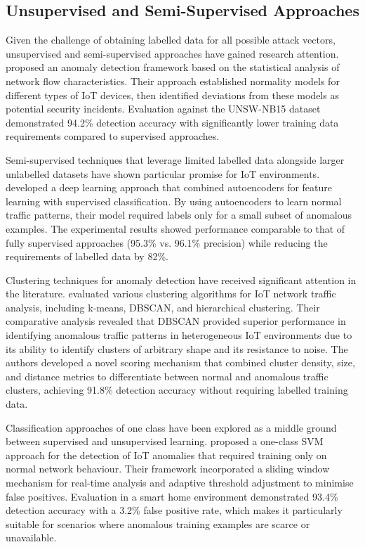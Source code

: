 \subsection{Unsupervised and Semi-Supervised Approaches}

Given the challenge of obtaining labelled data for all possible attack vectors, unsupervised and semi-supervised approaches have gained research attention. \citet{booij2021ton_iot} proposed an anomaly detection framework based on the statistical analysis of network flow characteristics. Their approach established normality models for different types of IoT devices, then identified deviations from these models as potential security incidents. Evaluation against the UNSW-NB15 dataset demonstrated 94.2\% detection accuracy with significantly lower training data requirements compared to supervised approaches.

Semi-supervised techniques that leverage limited labelled data alongside larger unlabelled datasets have shown particular promise for IoT environments. \citet{Nguyen2019} developed a deep learning approach that combined autoencoders for feature learning with supervised classification. By using autoencoders to learn normal traffic patterns, their model required labels only for a small subset of anomalous examples. The experimental results showed performance comparable to that of fully supervised approaches (95.3\% vs. 96.1\% precision) while reducing the requirements of labelled data by 82\%.

Clustering techniques for anomaly detection have received significant attention in the literature. \citet{Bartos2019} evaluated various clustering algorithms for IoT network traffic analysis, including k-means, DBSCAN, and hierarchical clustering. Their comparative analysis revealed that DBSCAN provided superior performance in identifying anomalous traffic patterns in heterogeneous IoT environments due to its ability to identify clusters of arbitrary shape and its resistance to noise. The authors developed a novel scoring mechanism that combined cluster density, size, and distance metrics to differentiate between normal and anomalous traffic clusters, achieving 91.8\% detection accuracy without requiring labelled training data.

Classification approaches of one class have been explored as a middle ground between supervised and unsupervised learning. \citet{Sarigiannidis2021} proposed a one-class SVM approach for the detection of IoT anomalies that required training only on normal network behaviour. Their framework incorporated a sliding window mechanism for real-time analysis and adaptive threshold adjustment to minimise false positives. Evaluation in a smart home environment demonstrated 93.4\% detection accuracy with a 3.2\% false positive rate, which makes it particularly suitable for scenarios where anomalous training examples are scarce or unavailable.

